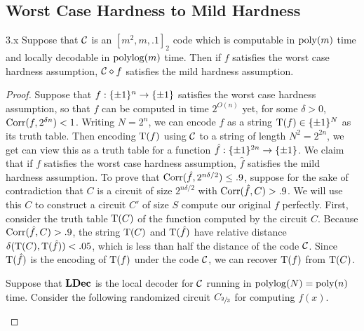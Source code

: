 \documentclass[11pt]{article}
\begin{document}
\subsection{Worst Case Hardness to Mild Hardness}

\newpage

\begin{theorem}{3.x}
    Suppose that $\mathcal{C}$ is an $[m^2, m, .1]_2$ code which is computable in $\mathrm{poly}(m)$ time and locally decodable in $\mathrm{polylog} (m)$ time. Then if $f$ satisfies the worst case hardness assumption, $\mathcal{C} \diamond f$ satisfies the mild hardness assumption.
\end{theorem}

\begin{proof}
    Suppose that $f : \{\pm 1\}^n \rightarrow \{\pm 1\}$ satisfies the worst case hardness assumption, so that $f$ can be computed in time $2^{O(n)}$ yet, for some $\delta > 0$, $\mathrm{Corr}(f, 2^{\delta n}) < 1$. Writing $N = 2^n$, we can encode $f$ as a string $\mathrm{T}(f) \in \{\pm 1\}^{N}$ as its truth table. Then encoding $\mathrm{T}(f)$ using $\mathcal{C}$ to a string of length $N^2 = 2^{2n}$, we get can view this as a truth table for a function $\hat{f} : \{\pm 1\}^{2n} \rightarrow \{\pm 1\}$. We claim that if $f$ satisfies the worst case hardness assumption, $\hat{f}$ satisfies the mild hardness assumption. To prove that $\mathrm{Corr}(\hat{f}, 2^{n\delta/2}) \leq .9$, suppose for the sake of contradiction that $C$ is a circuit of size $2^{n \delta /2}$ with $\mathrm{Corr}(\hat{f}, C) > .9$. We will use this $C$ to construct a circuit $C'$ of size $S$ compute our original $f$ perfectly. First, consider the truth table $\mathrm{T}(C)$ of the function computed by the circuit $C$. Because $\mathrm{Corr}(\hat{f}, C) > .9$, the string $\mathrm{T}(C)$ and $\mathrm{T}(\hat{f})$ have relative distance $\delta(\mathrm{T}(C), \mathrm{T}(\hat{f})) < .05$, which is less than half the distance of the code $\mathcal{C}$. Since $\mathrm{T}(\hat{f})$ is the encoding of $\mathrm{T}(f)$ under the code $\mathcal{C}$, we can recover $\mathrm{T}(f)$ from $\mathrm{T}(C)$.

    Suppose that $\text{\textbf{LDec}}$ is the local decoder for $\mathcal{C}$ running in $\mathrm{polylog}(N) = \mathrm{poly}(n)$ time. Consider the following randomized circuit $C_{\sfrac{2}{3}}$ for computing $f(x)$.

    \parbox{.4\linewidth}{%
        \begin{center}
\end{center}}
\end{proof}
\end{document}
